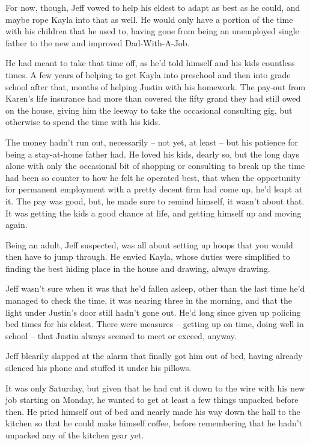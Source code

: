 For now, though, Jeff vowed to help his eldest to adapt as best as he could, and maybe rope Kayla into that as well.  He would only have a portion of the time with his children that he used to, having gone from being an unemployed single father to the new and improved Dad-With-A-Job.

He had meant to take that time off, as he'd told himself and his kids countless times.  A few years of helping to get Kayla into preschool and then into grade school after that, months of helping Justin with his homework.  The pay-out from Karen's life insurance had more than covered the fifty grand they had still owed on the house, giving him the leeway to take the occasional consulting gig, but otherwise to spend the time with his kids.

The money hadn't run out, necessarily -- not yet, at least -- but his patience for being a stay-at-home father had.  He loved his kids, dearly so, but the long days alone with only the occasional bit of shopping or consulting to break up the time had been so counter to how he felt he operated best, that when the opportunity for permanent employment with a pretty decent firm had come up, he'd leapt at it.  The pay was good, but, he made sure to remind himself, it wasn't about that.  It was getting the kids a good chance at life, and getting himself up and moving again.

Being an adult, Jeff suspected, was all about setting up hoops that you would then have to jump through.  He envied Kayla, whose duties were simplified to finding the best hiding place in the house and drawing, always drawing.

Jeff wasn't sure when it was that he'd fallen asleep, other than the last time he'd managed to check the time, it was nearing three in the morning, and that the light under Justin's door still hadn't gone out.  He'd long since given up policing bed times for his eldest.  There were measures -- getting up on time, doing well in school -- that Justin always seemed to meet or exceed, anyway.

\secdiv

Jeff blearily slapped at the alarm that finally got him out of bed, having already silenced his phone and stuffed it under his pillows.

It was only Saturday, but given that he had cut it down to the wire with his new job starting on Monday, he wanted to get at least a few things unpacked before then.  He pried himself out of bed and nearly made his way down the hall to the kitchen so that he could make himself coffee, before remembering that he hadn't unpacked any of the kitchen gear yet.

